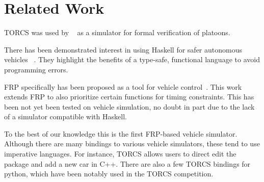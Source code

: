 \section{Related Work}

TORCS was used by ~\cite{kamali2016formal} as a simulator for formal verification of platoons.

There has been demonstrated interest in using Haskell for safer autonomous vehicles ~\cite{pike2014}.
They highlight the benefits of a type-safe, functional language to avoid programming errors.

FRP specifically has been proposed as a tool for vehicle control~\cite{kazemi2016,zuo16}.
This work extends FRP to also prioritize certain functions for timing constraints.
This has been not yet been tested on vehicle simulation, no doubt in part due to the lack of a simulator compatible with Haskell.

To the best of our knowledge this is the first FRP-based vehicle simulator.
Although there are many bindings to various vehicle simulators, these tend to use imperative languages.
For instance, TORCS allows users to direct edit the package and add a new car in C++.
There are also a few TORCS bindings for python, which have been notably used in the TORCS competition.
